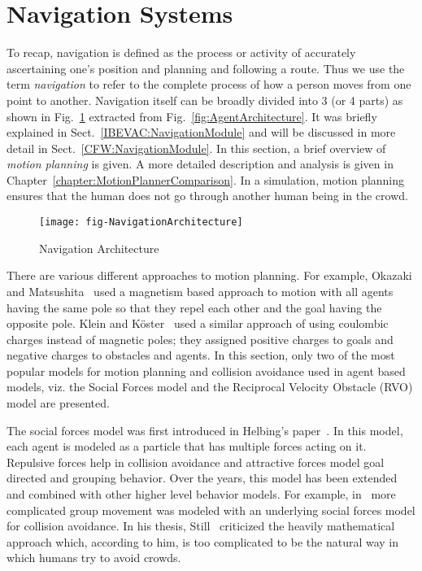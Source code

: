 \section{Navigation Systems}
\label{IBP:MotionPlanning}

To recap, navigation is defined as the process or activity of accurately ascertaining one's position and planning and following a route. Thus we use the term \emph{navigation} to refer to the complete process of how a person moves from one point to another. Navigation itself can be broadly divided into 3 (or 4 parts) as shown in Fig.~\ref{fig:NavigationArchitecture} extracted from Fig.~\ref{fig:AgentArchitecture}. It was briefly explained in Sect.~\ref{IBEVAC:NavigationModule} and will be discussed in more detail in Sect.~\ref{CFW:NavigationModule}. In this section, a brief overview of \emph{motion planning} is given. A more detailed description and analysis is given in Chapter~\ref{chapter:MotionPlannerComparison}. In a simulation, motion planning ensures that the human does not go through another human being in the crowd.

\begin{figure}[!tb]
\centering
\texttt{[image: fig-NavigationArchitecture]}
\caption{Navigation Architecture}
\label{fig:NavigationArchitecture}
\end{figure}

There are various different approaches to motion planning. For example,  Okazaki and Matsushita~\cite{Okazaki:1993wh} used a magnetism based approach to motion with all agents having the same pole so that they repel each other and the goal having the opposite pole. Klein and K\"oster~\cite{Klein:2009} used a similar approach of using coulombic charges instead of magnetic poles; they assigned positive charges to goals and negative charges to obstacles and agents. In this section, only two of the most popular models for motion planning and collision avoidance used in agent based models, viz. the Social Forces model and the Reciprocal Velocity Obstacle (RVO) model are presented.

The social forces model was first introduced in Helbing's paper~\cite{Helbing:1995ie}. In this model, each agent is modeled as a particle that has multiple forces acting on it. Repulsive forces help in collision avoidance and attractive forces model goal directed and grouping behavior. Over the years, this model has been extended and combined with other higher level behavior models. For example, in~\cite{Kamphuis:2004uu} more complicated group movement was modeled with an underlying social forces model for collision avoidance. In his thesis, Still~\cite{Still:2000tp} criticized the heavily mathematical approach which, according to him, is too complicated to be the natural way in which humans try to avoid crowds.

